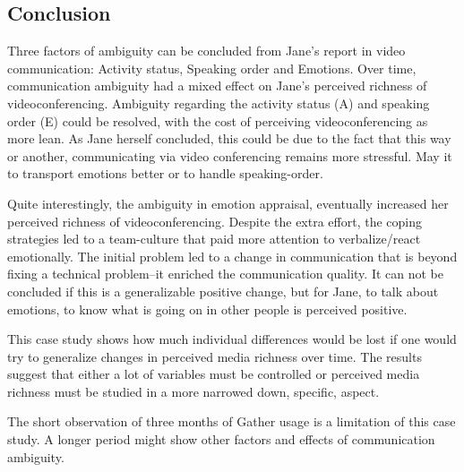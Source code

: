 \documentclass[man]{apa7}
\begin{document}
\subsection{Conclusion}

Three factors of ambiguity can be concluded from Jane's report in video communication: Activity status, Speaking order and Emotions. Over time, communication ambiguity had a mixed effect on Jane's perceived richness of videoconferencing. Ambiguity regarding the activity status (A) and speaking order (E) could be resolved, with the cost of perceiving videoconferencing as more lean. As Jane herself concluded, this could be due to the fact that this way or another, communicating via video conferencing remains more stressful. May it to transport emotions better or to handle speaking-order.

Quite interestingly, the ambiguity in emotion appraisal, eventually increased her perceived richness of videoconferencing. Despite the extra effort, the coping strategies led to a team-culture that paid more attention to verbalize/react emotionally. The initial problem led to a change in communication that is beyond fixing a technical problem–it enriched the communication quality. It can not be concluded if this is a generalizable positive change, but for Jane, to talk about emotions, to know what is going on in other people is perceived positive.

This case study shows how much individual differences would be lost if one would try to generalize changes in perceived media richness over time. The results suggest that either a lot of variables must be controlled or perceived media richness must be studied in a more narrowed down, specific, aspect.

The short observation of three months of Gather usage is a limitation of this case study. A longer period might show other factors and effects of communication ambiguity.

\printbibliography

\appendix
\end{document}
